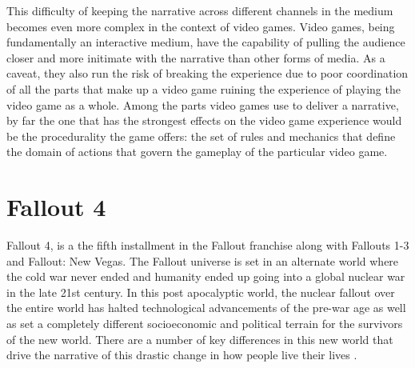 \documentclass[12pt, conference]{IEEEtran}
\begin{document}
This difficulty of keeping the narrative across different channels in the medium becomes even more complex in the context of video games. Video games, being fundamentally an interactive medium, have the capability of pulling the audience closer and more initimate with the narrative than other forms of media. As a caveat, they also run the risk of breaking the experience due to poor coordination of all the parts that make up a video game ruining the experience of playing the video game as a whole. Among the parts video games use to deliver a narrative, by far the one that has the strongest effects on the video game experience would be the procedurality the game offers: the set of rules and mechanics that define the domain of actions that govern the gameplay of the particular video game.\\

\section{Fallout 4}

Fallout 4, is a the fifth installment in the Fallout franchise along with Fallouts 1-3 and Fallout: New Vegas. The Fallout universe is set in an alternate world where the cold war never ended and humanity ended up going into a global nuclear war in the late 21st century. In this post apocalyptic world, the nuclear fallout over the entire world has halted technological advancements of the pre-war age as well as set a completely different socioeconomic and political terrain for the survivors of the new world. There are a number of key differences in this new world that drive the narrative of this drastic change in how people live their lives \cite{lovelifeandanarchy}.\\
\end{document}
